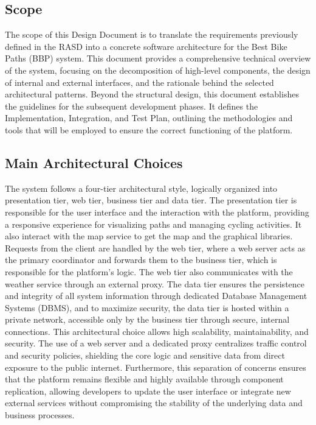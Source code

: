 \subsection{Scope}
The scope of this Design Document is to translate the requirements previously defined in the RASD into a concrete software architecture for the Best Bike Paths (BBP) system. This document provides a comprehensive technical overview of the system, focusing on the decomposition of high-level components, the design of internal and external interfaces, and the rationale behind the selected architectural patterns.
Beyond the structural design, this document establishes the guidelines for the subsequent development phases. It defines the Implementation, Integration, and Test Plan, outlining the methodologies and tools that will be employed to ensure the correct functioning of the platform.

\subsection{Main Architectural Choices}
The system follows a four-tier architectural style, logically organized into presentation tier, web tier, business tier and data tier. The presentation tier is responsible for the user interface and the interaction with the platform, providing a responsive experience for visualizing paths and managing cycling activities. It also interact with the map service to get the map and the graphical libraries. Requests from the client are handled by the web tier, where a web server acts as the primary coordinator and forwards them to the business tier, which is responsible for the platform’s logic. The web tier also communicates with the weather service through an external proxy. The data tier ensures the persistence and integrity of all system information through dedicated Database Management Systems (DBMS), and to maximize security, the data tier is hosted within a private network, accessible only by the business tier through secure, internal connections. This architectural choice allows high scalability, maintainability, and security. The use of a web server and a dedicated proxy centralizes traffic control and security policies, shielding the core logic and sensitive data from direct exposure to the public internet. Furthermore, this separation of concerns ensures that the platform remains flexible and highly available through component replication, allowing developers to update the user interface or integrate new external services without compromising the stability of the underlying data and business processes.

